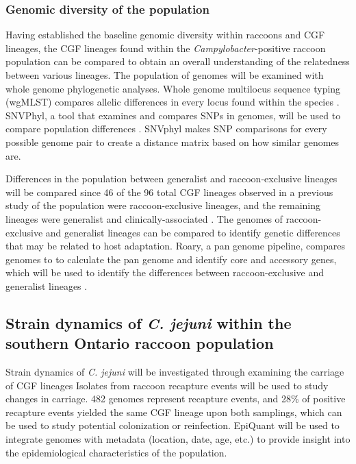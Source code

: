 \documentclass[letterpaper,titlepage,12pt]{article}
\begin{document}
\subsubsection{Genomic diversity of the population} %

Having established the baseline genomic diversity within raccoons and CGF lineages, the CGF lineages found within the \textit{Campylobacter}-positive raccoon population can be compared to obtain an overall understanding of the relatedness between various lineages. The population of genomes will be examined with whole genome phylogenetic analyses. Whole genome multilocus sequence typing (wgMLST) compares allelic differences in every locus found within the species \parencite{cody2013real}. SNVPhyl, a tool that examines and compares SNPs in genomes,  will be used to compare population differences \parencite{petkau2017snvphyl}. SNVphyl makes SNP comparisons for every possible genome pair to create a distance matrix based on how similar genomes are. 

Differences in the population between generalist and raccoon-exclusive lineages will be compared since 46 of the 96 total CGF lineages observed in a previous study of the population were raccoon-exclusive lineages, and the remaining lineages were generalist and clinically-associated \parencite{mutschall2020campylobacter}. The genomes of raccoon-exclusive and generalist lineages can be compared to identify genetic differences that may be related to host adaptation. Roary, a pan genome  pipeline, compares genomes to to calculate the pan genome and identify core and accessory genes, which will be used to identify the differences between raccoon-exclusive and generalist lineages \parencite{page2015roary}. 


\subsection{Strain dynamics of \textit{C. jejuni} within the southern Ontario raccoon population}

Strain dynamics of \textit{C. jejuni} will be investigated through examining the carriage of CGF lineages %
Isolates from raccoon recapture events will be used to study changes in carriage. 482 genomes represent recapture events, and 28\% of positive recapture events yielded the same CGF lineage upon both samplings, which can be used to study potential colonization or reinfection. EpiQuant \parencite{hetman2017epiquant} will be used to integrate genomes with metadata (location, date, age, etc.) to provide insight into the epidemiological characteristics of the population. 
\end{document}
